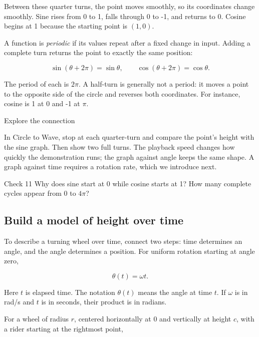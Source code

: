 Between these quarter turns, the point moves smoothly, so its coordinates change smoothly. Sine rises from 0 to 1, falls through 0 to -1, and returns to 0. Cosine begins at 1 because the starting point is \((1,0)\).



A function is \emph{periodic} if its values repeat after a fixed change in input. Adding a complete turn returns the point to exactly the same position:


\[\sin(\theta+2\pi)=\sin\theta,\qquad\cos(\theta+2\pi)=\cos\theta.\]

The period of each is \(2\pi\). A half-turn is generally not a period: it moves a point to the opposite side of the circle and reverses both coordinates. For instance, cosine is 1 at 0 and -1 at \(\pi\).



\begin{moneaside}{Explore the connection}

In Circle to Wave, stop at each quarter-turn and compare the point's height with the sine graph. Then show two full turns. The playback speed changes how quickly the demonstration runs; the graph against angle keeps the same shape. A graph against time requires a rotation rate, which we introduce next.


\end{moneaside}

\begin{monecheck}{Check 11}
Why does sine start at 0 while cosine starts at 1? How many complete cycles appear from 0 to \(4\pi\)?
\end{monecheck}

\subsection{Build a model of height over time}

To describe a turning wheel over time, connect two steps: time determines an angle, and the angle determines a position. For uniform rotation starting at angle zero,


\[\theta(t)=\omega t.\]

Here \(t\) is elapsed time. The notation \(\theta(t)\) means the angle at time \(t\). If \(\omega\) is in rad/s and \(t\) is in seconds, their product is in radians.



For a wheel of radius \(r\), centered horizontally at 0 and vertically at height \(c\), with a rider starting at the rightmost point,


